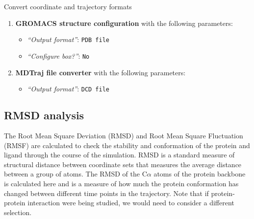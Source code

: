 \documentclass[twocolumn]{bmcart}%
\providecommand{\tightlist}{%
  \setlength{\itemsep}{0pt}\setlength{\parskip}{0pt}}
\begin{document}
\begin{handson_box_colour}{Convert coordinate and trajectory formats}
\begin{enumerate}
\def\labelenumi{\arabic{enumi}.}
 \item
  \textbf{GROMACS structure configuration} with the following
  parameters:

  \begin{itemize}
  \tightlist
  \item
    \emph{``Output format''}: \texttt{PDB\ file}
  \item
    \emph{``Configure box?''}: \texttt{No}
  \end{itemize}

 \item
  \textbf{MDTraj file converter} with the following parameters:

  \begin{itemize}
  \tightlist
  \item
    \emph{``Output format''}: \texttt{DCD\ file}
  \end{itemize}
\end{enumerate}
\end{handson_box_colour}




\hypertarget{rmsd-analysis}{%
\subsection*{RMSD analysis}\label{rmsd-analysis}}


The Root Mean Square Deviation (RMSD) and Root Mean Square Fluctuation (RMSF) are calculated to check the stability and conformation of the protein and ligand through the course of the simulation. 
RMSD is a standard measure of structural distance between coordinate
sets that measures the average distance between a group of atoms. The
RMSD of the C$\alpha$ atoms of the protein backbone is calculated here and
is a measure of how much the protein conformation has changed between different time points in the trajectory. Note that if protein-protein interaction were being studied, we would need to consider a different selection. 
\end{document}
